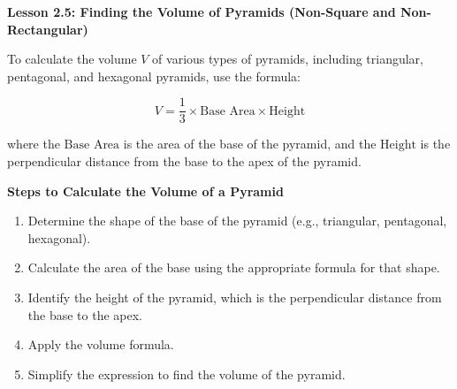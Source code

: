   \begin{center}
\textbf{Lesson 2.5: Finding the Volume of Pyramids (Non-Square and Non-Rectangular)}
\end{center}

\vspace*{1ex}

To calculate the volume \(V\) of various types of pyramids, including triangular, pentagonal, and hexagonal pyramids, use the formula:

\[
V = \frac{1}{3} \times \text{Base Area} \times \text{Height}
\]

where the \(\text{Base Area}\) is the area of the base of the pyramid, and the \(\text{Height}\) is the perpendicular distance from the base to the apex of the pyramid.

\noindent\textbf{Steps to Calculate the Volume of a Pyramid}
\begin{enumerate}
    \item Determine the shape of the base of the pyramid (e.g., triangular, pentagonal, hexagonal).
    \item Calculate the area of the base using the appropriate formula for that shape.
    \item Identify the height of the pyramid, which is the perpendicular distance from the base to the apex.
    \item Apply the volume formula.
    \item Simplify the expression to find the volume of the pyramid.
\end{enumerate}



